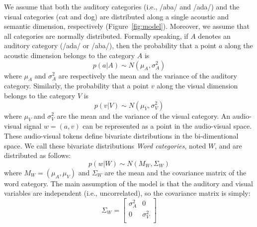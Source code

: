 \documentclass[english,,man,floatsintext]{apa6}
\theoremstyle{definition}
\theoremstyle{definition}
\theoremstyle{definition}
\theoremstyle{remark}
\begin{document}
We assume that both the auditory categories (i.e., /aba/ and /ada/) and
the visual categories (cat and dog) are distributed along a single
acoustic and semantic dimension, respectively (Figure~\ref{fig:model}).
Moreover, we assume that all categories are normally distributed.
Formally speaking, if \(A\) denotes an auditory category (/ada/ or
/aba/), then the probability that a point \(a\) along the acoustic
dimension belongs to the category \(A\) is
\[ p(a | A) \sim  N(\mu_A, \sigma^2_A) \] where \(\mu_A\) and
\(\sigma^2_A\) are respectively the mean and the variance of the
auditory category. Similarly, the probability that a point \(v\) along
the visual dimension belongs to the category \(V\) is
\[ p(v | V) \sim  N(\mu_V, \sigma^2_V) \] where \(\mu_V\) and
\(\sigma^2_V\) are the mean and the variance of the visual category. An
audio-visual signal \(w=(a,v)\) can be represented as a point in the
audio-visual space. These audio-visual tokens define bivariate
distributions in the bi-dimentional space. We call these bivariate
distributions \emph{Word categories}, noted \(W\), and are distributed
as follows: \[ p(w | W) \sim  N(M_W, \Sigma_W) \] where
\(M_W=(\mu_A, \mu_V)\) and \(\Sigma_W\) are the mean and the covariance
matrix of the word category. The main assumption of the model is that
the auditory and visual variables are independent (i.e., uncorrelated),
so the covariance matrix is simply: \[
   \Sigma_W=
  \left[ {\begin{array}{cc}
   \sigma^2_A & 0 \\
   0 & \sigma^2_V \\
  \end{array} } \right]
\]
\end{document}
